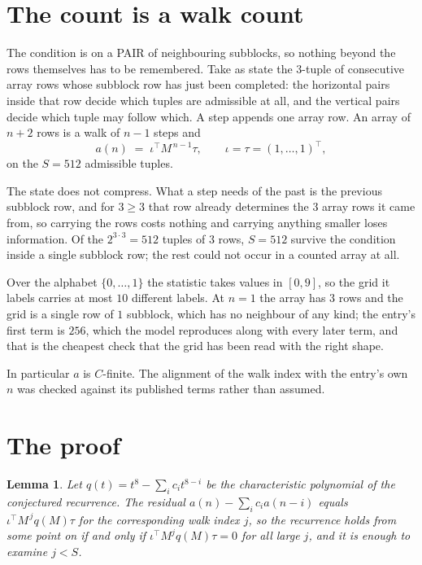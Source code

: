 \documentclass[11pt,a4paper]{article}
\theoremstyle{plain}
\newtheorem{lemma}[theorem]{Lemma}
\theoremstyle{definition}
\begin{document}
\section{The count is a walk count}

The condition is on a PAIR of neighbouring subblocks, so nothing beyond the
rows themselves has to be remembered. Take as state the $3$-tuple of consecutive array rows
whose subblock row has just been completed: the horizontal pairs inside that row decide which
tuples are admissible at all, and the vertical pairs decide which tuple may follow which. A
step appends one array row. An array of $n+2$ rows is a walk of $n-1$ steps and
\[
a(n)\;=\;\iota^{\!\top}M^{\,n-1}\tau,\qquad\iota=\tau=(1,\dots,1)^{\!\top},
\]
on the $S=512$ admissible tuples.

The state does not compress. What a step needs of the past is the previous subblock row, and
for $3\ge3$ that row already determines the $3$ array rows it came from, so carrying the
rows costs nothing and carrying anything smaller loses information. Of the $2^{3\cdot
3}=512$ tuples of $3$ rows, $S=512$ survive the condition inside a single subblock row;
the rest could not occur in a counted array at all.

Over the alphabet $\{0,\dots,1\}$ the statistic takes values in $[0,9]$, so the
grid it labels carries at most $10$ different labels. At $n=1$ the array has $3$
rows and the grid is a single row of $1$
subblock, which has no neighbour of any kind; the entry's first term is
$256$, which the model reproduces along with every later term, and that is the cheapest
check that the grid has been read with the right shape.

In particular $a$ is $C$-finite. The alignment of the walk index with the entry's own $n$ was
checked against its published terms rather than assumed.

\section{The proof}

\begin{lemma}\label{lem:crit}
Let $q(t)=t^{8}-\sum_i c_it^{8-i}$ be the characteristic polynomial of the
conjectured recurrence. The residual $a(n)-\sum_ic_ia(n-i)$ equals
$\iota^{\!\top}M^{\,j}q(M)\tau$ for the corresponding walk index $j$, so the recurrence
holds from some point on if and only if $\iota^{\!\top}M^{j}q(M)\tau=0$ for all large $j$,
and it is enough to examine $j<S$.
\end{lemma}
\end{document}
